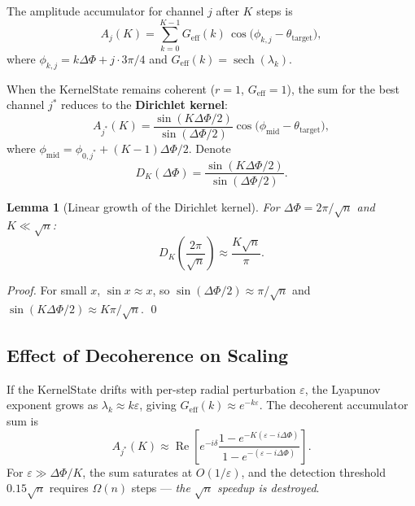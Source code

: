 \documentclass[12pt,a4paper]{article}
\theoremstyle{plain}
\newtheorem{lemma}[theorem]{Lemma}
\theoremstyle{definition}
\theoremstyle{remark}
\newcommand{\Geff}{G_{\mathrm{eff}}}
\begin{document}
The amplitude accumulator for channel $j$ after $K$ steps is
\begin{equation}
  A_j(K) = \sum_{k=0}^{K-1}
    \Geff(k)\,\cos\!\bigl(\phi_{k,j} - \theta_{\mathrm{target}}\bigr),
  \label{eq:accumulator}
\end{equation}
where $\phi_{k,j} = k\Delta\Phi + j\cdot 3\pi/4$ and
$\Geff(k) = \operatorname{sech}(\lambda_k)$.

When the KernelState remains coherent ($r=1$, $\Geff=1$), the sum for the
best channel $j^*$ reduces to the \textbf{Dirichlet kernel}:
\begin{equation}
  A_{j^*}(K)
  = \frac{\sin(K\Delta\Phi/2)}{\sin(\Delta\Phi/2)}
    \cos\!\bigl(\phi_{\mathrm{mid}} - \theta_{\mathrm{target}}\bigr),
  \label{eq:dirichlet-formula}
\end{equation}
where $\phi_{\mathrm{mid}} = \phi_{0,j^*} + (K-1)\Delta\Phi/2$.
Denote
\begin{equation}
  D_K(\Delta\Phi) = \frac{\sin(K\Delta\Phi/2)}{\sin(\Delta\Phi/2)}.
  \label{eq:dirichlet-kernel}
\end{equation}

\begin{lemma}[Linear growth of the Dirichlet kernel]\label{lem:dk-growth}
  For $\Delta\Phi = 2\pi/\sqrt{n}$ and $K \ll \sqrt{n}$:
  \begin{equation}
    D_K\!\left(\frac{2\pi}{\sqrt{n}}\right)
    \approx \frac{K\sqrt{n}}{\pi}.
    \label{eq:dk-linear}
  \end{equation}
\end{lemma}

\begin{proof}
  For small $x$, $\sin x \approx x$, so
  $\sin(\Delta\Phi/2) \approx \pi/\sqrt{n}$ and
  $\sin(K\Delta\Phi/2) \approx K\pi/\sqrt{n}$. \qed
\end{proof}

\subsection{Effect of Decoherence on Scaling}

If the KernelState drifts with per-step radial perturbation $\varepsilon$,
the Lyapunov exponent grows as $\lambda_k \approx k\varepsilon$, giving
$\Geff(k) \approx e^{-k\varepsilon}$.  The decoherent accumulator sum is
\begin{equation}
  A_{j^*}(K)
  \approx \operatorname{Re}\!\left[
    e^{-i\delta}
    \frac{1-e^{-K(\varepsilon - i\Delta\Phi)}}
         {1-e^{-(\varepsilon - i\Delta\Phi)}}
  \right].
  \label{eq:decoherent-sum}
\end{equation}
For $\varepsilon \gg \Delta\Phi/K$, the sum saturates at $O(1/\varepsilon)$,
and the detection threshold $0.15\sqrt{n}$ requires $\Omega(n)$ steps —
\emph{the $\sqrt{n}$ speedup is destroyed}.
\end{document}
